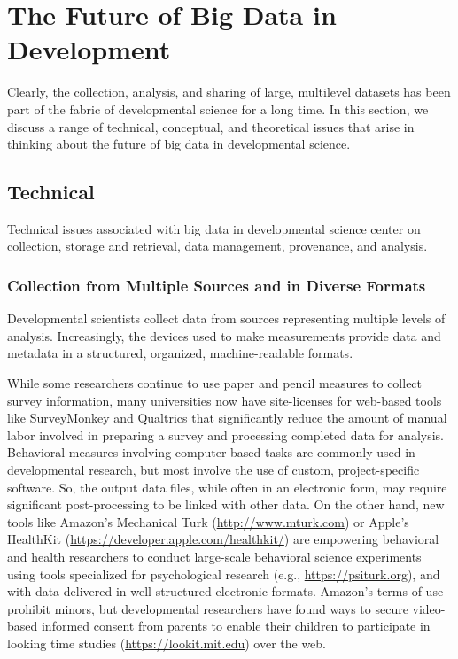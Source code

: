 \documentclass[letterpaper,man,apacite]{apa6}
\begin{document}
\section{The Future of Big Data in Development}

Clearly, the collection, analysis, and sharing of large, multilevel datasets has been part of the fabric of developmental science for a long time.
In this section, we discuss a range of technical, conceptual, and theoretical issues that arise in thinking about the future of big data in developmental science. 

\subsection{Technical}

Technical issues associated with big data in developmental science center on collection, storage and retrieval, data management, provenance, and analysis. 

\subsubsection{Collection from Multiple Sources and in Diverse Formats}

Developmental scientists collect data from sources representing multiple levels of analysis.
Increasingly, the devices used to make measurements provide data and metadata in a structured, organized, machine-readable formats.

While some researchers continue to use paper and pencil measures to collect survey information, many universities now have site-licenses for web-based tools like SurveyMonkey and Qualtrics that significantly reduce the amount of manual labor involved in preparing a survey and processing completed data for analysis. 
Behavioral measures involving computer-based tasks are commonly used in developmental research, but most involve the use of custom, project-specific software.
So, the output data files, while often in an electronic form, may require significant post-processing to be linked with other data.
On the other hand, new tools like Amazon's Mechanical Turk (\url{http://www.mturk.com}) or Apple's HealthKit (\url{https://developer.apple.com/healthkit/}) are empowering behavioral and health researchers to conduct large-scale behavioral science experiments using tools specialized for psychological research (e.g., \url{https://psiturk.org}), and with data delivered in well-structured electronic formats.
Amazon's terms of use prohibit minors, but developmental researchers have found ways to secure video-based informed consent from parents to enable their children to participate in looking time studies (\url{https://lookit.mit.edu}) over the web.
\end{document}
